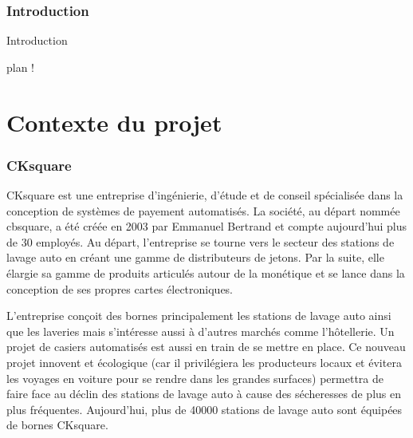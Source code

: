 \documentclass[a4paper]{article}
\begin{document}
\clearpage{}

\pagestyle{plain}
\setcounter{page}{1}
\clearpage
\section*{Introduction}

Introduction

plan !

\clearpage{}



\part{Contexte du projet}

\section{CKsquare}%

CKsquare est une entreprise d'ingénierie, d'étude et de conseil spécialisée dans
la conception de systèmes de payement automatisés. La société, au départ nommée
cbsquare, a été créée en 2003 par Emmanuel Bertrand et compte aujourd'hui plus
de 30 employés. Au départ, l'entreprise se tourne vers le secteur des stations
de lavage auto en créant une gamme de distributeurs de jetons. Par la suite,
elle élargie sa gamme de produits articulés autour de la monétique et se lance
dans la conception de ses propres cartes électroniques.

L'entreprise conçoit des bornes principalement les stations de lavage auto ainsi
que les laveries mais s'intéresse aussi à d'autres marchés comme l'hôtellerie.
Un projet de casiers automatisés est aussi en train de se mettre en place. Ce
nouveau projet innovent et écologique (car il privilégiera les producteurs
locaux et évitera les voyages en voiture pour se rendre dans les grandes
surfaces) permettra de faire face au déclin des stations de lavage auto à cause
des sécheresses de plus en plus fréquentes. Aujourd'hui, plus de 40000 stations
de lavage auto sont équipées de bornes CKsquare.
\end{document}
